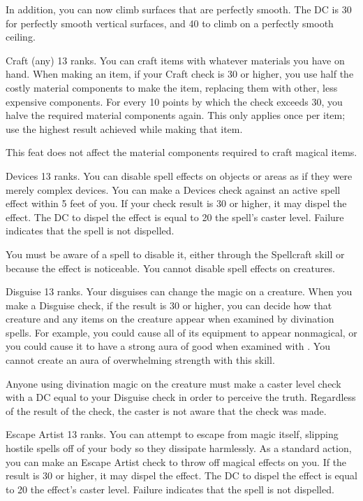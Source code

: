 In addition, you can now climb surfaces that are perfectly smooth. The DC is 30 for perfectly smooth vertical surfaces, and 40 to climb on a perfectly smooth ceiling.

\featpre Craft (any) 13 ranks.
\featben You can craft items with whatever materials you have on hand. When making an item, if your Craft check is 30 or higher, you use half the costly material components to make the item, replacing them with other, less expensive components. For every 10 points by which the check exceeds 30, you halve the required material components again. This only applies once per item; use the highest result achieved while making that item.

This feat does not affect the material components required to craft magical items.

\featpre Devices 13 ranks.
\featben You can disable spell effects on objects or areas as if they were merely complex devices. You can make a Devices check against an active spell effect within 5 feet of you. If your check result is 30 or higher, it may dispel the effect. The DC to dispel the effect is equal to 20 \add the spell's caster level. Failure indicates that the spell is not dispelled. 

You must be aware of a spell to disable it, either through the Spellcraft skill or because the effect is noticeable. You cannot disable spell effects on creatures.

\featpre Disguise 13 ranks.
\featben Your disguises can change the magic on a creature. When you make a Disguise check, if the result is 30 or higher, you can decide how that creature and any items on the creature appear when examined by divination spells. For example, you could cause all of its equipment to appear nonmagical, or you could cause it to have a strong aura of good when examined with . You cannot create an aura of overwhelming strength with this skill.

Anyone using divination magic on the creature must make a caster level check with a DC equal to your Disguise check in order to perceive the truth. Regardless of the result of the check, the caster is not aware that the check was made.

\featpre Escape Artist 13 ranks.
\featben You can attempt to escape from magic itself, slipping hostile spells off of your body so they dissipate harmlessly. As a standard action, you can make an Escape Artist check to throw off magical effects on you. If the result is 30 or higher, it may dispel the effect. The DC to dispel the effect is equal to 20 \add the effect's caster level. Failure indicates that the spell is not dispelled.

